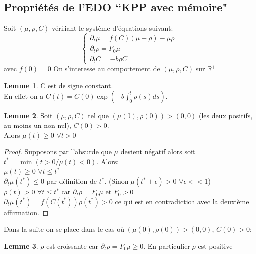 \documentclass[11pt]{article}
\newcommand{\dt}{\partial_t}
\theoremstyle{definition}
\begin{document}
\fi


\subsection{Propriétés de l'EDO ``KPP avec mémoire"}
\newtheorem{lemma}{Lemme}
Soit $(\mu,\rho,C)$ vérifiant le système d’équations suivant:
\begin{equation} \left\{
                \begin{array}{ll}
                   \dt\mu  = f(C)(\mu + \rho) -\mu\rho\\
                 \dt\rho=  F_0 \mu \\
                  \dt C = -b\rho C
                \end{array}
              \right.
\end{equation} avec $f(0)=0$
On s'interesse au comportement de $(\mu,\rho,C)$ sur $\mathbb{R}^+$
\begin{lemma}C est de signe constant.\\
En effet on a $C(t)= C(0)\exp(-b\int_{0}^{t}\rho(s)ds)$.
\end{lemma}

\begin{lemma}Soit $(\mu,\rho,C)$ tel que $(\mu(0),\rho(0))> (0,0)$ (les deux positifs, au moins un non nul), $C(0)>0$.\\  Alors $\mu(t)\geq 0$ $\forall t>0$
\end{lemma}
\begin{proof}
Supposons par l'absurde que $\mu$ devient négatif alors soit $t^*= \min(t>0/ \mu(t)<0)$. Alors: \\
$\mu(t)\geq 0$ $\forall t \leq t^*$\\
$\dt\mu(t^*) \leq 0$ par définition de $t^*$. (Sinon $\mu(t^*+\epsilon)>0$ $\forall \epsilon <<1$)\\
$\rho(t)>0$ $\forall t\leq t^*$ car $\dt\rho=  F_0 \mu$ et $F_0>0$\\
$\dt\mu(t^*) = f(C(t^*))\rho(t^*) > 0$ ce qui est en contradiction avec la deuxième affirmation.
\end{proof}
Dans la suite on se place dans le cas où $(\mu(0),\rho(0))> (0,0)$, $C(0)>0$:
\begin{lemma} $\rho$ est croissante car $\dt\rho=  F_0 \mu \geq 0$. En particulier $\rho$ est positive \end{lemma}
\end{document}
